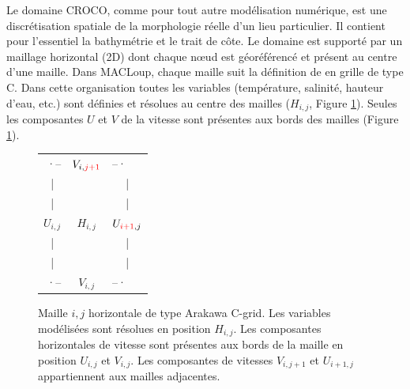 \documentclass[10pt,a4paper,titlepage]{article}
\begin{document}
Le domaine CROCO, comme pour tout autre modélisation numérique, est une discrétisation spatiale de la morphologie réelle d'un lieu particulier.
Il contient pour l'essentiel la bathymétrie et le trait de côte.
Le domaine est supporté par un maillage horizontal (2D) dont chaque n\oe{}ud est géoréférencé et présent au centre d'une maille.
Dans MACLoup, chaque maille suit la définition de \cite{Arakawa_C-grid_1977} en grille de type C.
Dans cette organisation toutes les variables (température, salinité, hauteur d'eau, etc.) sont définies et résolues au centre des mailles ($H_{i,j}$, Figure \ref{fig:structure_maille horizontale}).
Seules les composantes $U$ et $V$ de la vitesse sont présentes aux bords des mailles (Figure \ref{fig:structure_maille horizontale}).
\begin{figure}[h!]
    \centering
    \begin{tabular}{ c c c }
        \multicolumn{1}{r}{·--} & $V_{i,{\color{red}j+1}}$ & \multicolumn{1}{l}{--·} \\
        | & & | \\
        | & & | \\
        $U_{i,j}$ & $H_{i,j}$ & $U_{{\color{red}i+1},j}$ \\
        | & & | \\
        | & & | \\
        \multicolumn{1}{r}{·--} & \textbf{$V_{i,j}$} & \multicolumn{1}{l}{--·}
    \end{tabular}
    \caption{
        Maille $i,j$ horizontale de type Arakawa C-grid.
        Les variables modélisées sont résolues en position $H_{i,j}$.
        Les composantes horizontales de vitesse sont présentes aux bords de la maille en position $U_{i,j}$ et $V_{i,j}$.
        Les composantes de vitesses $V_{i,j+1}$ et $U_{i+1,j}$ appartiennent aux mailles adjacentes.
    }
    \label{fig:structure_maille horizontale}
\end{figure}
\end{document}
